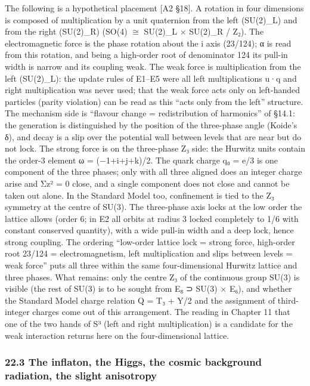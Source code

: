 \documentclass[
  a4paper,
]{article}
\begin{document}
The following is a hypothetical placement {[}A2 §18{]}. A rotation in
four dimensions is composed of multiplication by a unit quaternion from
the left (SU(2)\_L) and from the right (SU(2)\_R) (SO(4) \(\cong\)
SU(2)\_L × SU(2)\_R / Z₂). The electromagnetic force is the phase
rotation about the i axis (23/124); α is read from this rotation, and
being a high-order root of denominator 124 its pull-in width is narrow
and its coupling weak. The weak force is multiplication from the left
(SU(2)\_L): the update rules of E1--E5 were all left multiplications u·q
and right multiplication was never used; that the weak force acts only
on left-handed particles (parity violation) can be read as this ``acts
only from the left'' structure. The mechanism side is ``flavour change =
redistribution of harmonics'' of §14.1: the generation is distinguished
by the position of the three-phase angle (Koide's δ), and decay is a
slip over the potential wall between levels that are near but do not
lock. The strong force is on the three-phase Z₃ side: the Hurwitz units
contain the order-3 element ω = (−1+i+j+k)/2. The quark charge q₀ = e/3
is one component of the three phases; only with all three aligned does
an integer charge arise and Σz² = 0 close, and a single component does
not close and cannot be taken out alone. In the Standard Model too,
confinement is tied to the Z₃ symmetry at the centre of SU(3). The
three-phase axis locks at the low order the lattice allows (order 6; in
E2 all orbits at radius 3 locked completely to 1/6 with constant
conserved quantity), with a wide pull-in width and a deep lock, hence
strong coupling. The ordering ``low-order lattice lock = strong force,
high-order root 23/124 = electromagnetism, left multiplication and slips
between levels = weak force'' puts all three within the same
four-dimensional Hurwitz lattice and three phases. What remains: only
the centre Z₃ of the continuous group SU(3) is visible (the rest of
SU(3) is to be sought from E₈ ⊃ SU(3) × E₆), and whether the Standard
Model charge relation Q = T₃ + Y/2 and the assignment of third-integer
charges come out of this arrangement. The reading in Chapter 11 that one
of the two hands of S³ (left and right multiplication) is a candidate
for the weak interaction returns here on the four-dimensional lattice.

\subsubsection{22.3 The inflaton, the Higgs, the cosmic background
radiation, the slight
anisotropy}\label{the-inflaton-the-higgs-the-cosmic-background-radiation-the-slight-anisotropy}
\end{document}
